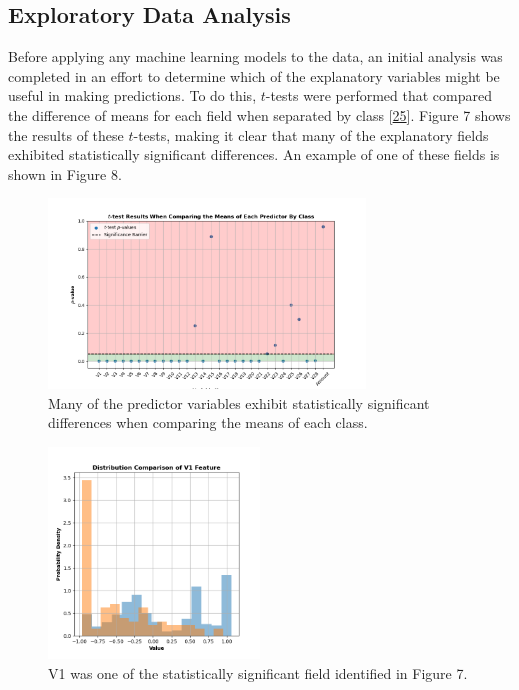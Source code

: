 \documentclass[11pt, oneside]{article}   	%
\begin{document}
\subsection{Exploratory Data Analysis}

Before applying any machine learning models to the data, an initial analysis was completed in an effort to determine which of the explanatory variables might be useful in making predictions. To do this, $t$-tests were performed that compared the difference of means for each field when separated by class [\href{https://doi.org/10.2307/2331554}{25}]. Figure 7 shows the results of these $t$-tests, making it clear that many of the explanatory fields exhibited statistically significant differences. An example of one of these fields is shown in Figure 8.

\begin{figure}[h!]
	\centering
	\includegraphics[width=0.75\textwidth]{figures/fig_7.png}
	\captionsetup{font=small} 
	\caption{Many of the predictor variables exhibit statistically significant differences when comparing the means of each class.}
	\label{fig7}
\end{figure}


\begin{figure}[h!]
	\centering
	\includegraphics[width=0.5\textwidth]{figures/fig_8.png}
	\captionsetup{font=small} 
	\caption{V1 was one of the statistically significant field identified in Figure 7.}
	\label{fig8}
\end{figure}
\end{document}

